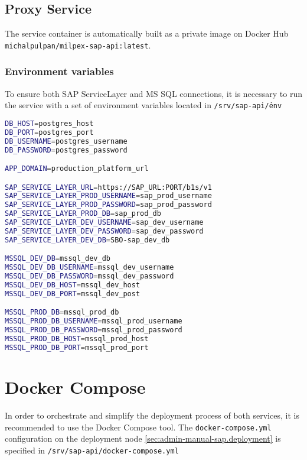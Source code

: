 \subsection{Proxy Service}
The service container is automatically built as a private image on Docker Hub \texttt{michalpulpan/milpex-sap-api:latest}.

\subsubsection{Environment variables}
To ensure both SAP ServiceLayer and MS SQL connections, it is necessary to run the service with a set of environment variables located in \texttt{/srv/sap-api/\.env}
\begin{lstlisting}[language=bash,caption={SAP Business One ServiceLayer Proxy with database connector environment variables setup}]
DB_HOST=postgres_host
DB_PORT=postgres_port
DB_USERNAME=postgres_username
DB_PASSWORD=postgres_password

APP_DOMAIN=production_platform_url

SAP_SERVICE_LAYER_URL=https://SAP_URL:PORT/b1s/v1
SAP_SERVICE_LAYER_PROD_USERNAME=sap_prod_username
SAP_SERVICE_LAYER_PROD_PASSWORD=sap_prod_password
SAP_SERVICE_LAYER_PROD_DB=sap_prod_db
SAP_SERVICE_LAYER_DEV_USERNAME=sap_dev_username
SAP_SERVICE_LAYER_DEV_PASSWORD=sap_dev_password
SAP_SERVICE_LAYER_DEV_DB=SBO-sap_dev_db

MSSQL_DEV_DB=mssql_dev_db
MSSQL_DEV_DB_USERNAME=mssql_dev_username
MSSQL_DEV_DB_PASSWORD=mssql_dev_password
MSSQL_DEV_DB_HOST=mssql_dev_host
MSSQL_DEV_DB_PORT=mssql_dev_post

MSSQL_PROD_DB=mssql_prod_db
MSSQL_PROD_DB_USERNAME=mssql_prod_username
MSSQL_PROD_DB_PASSWORD=mssql_prod_password
MSSQL_PROD_DB_HOST=mssql_prod_host
MSSQL_PROD_DB_PORT=mssql_prod_port
\end{lstlisting}


\section{Docker Compose}
In order to orchestrate and simplify the deployment process of both services, it is recommended to use the Docker Compose tool.
The \texttt{docker-compose.yml} configuration on the deployment node \ref{sec:admin-manual-sap.deployment} is specified in \texttt{/srv/sap-api/docker-compose.yml}

